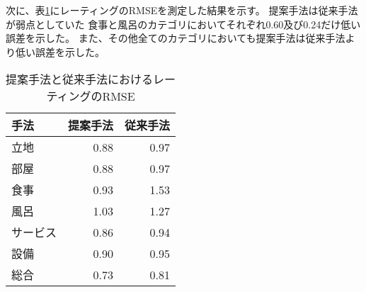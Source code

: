 次に、表\ref{tab:RMSEs}にレーティングのRMSEを測定した結果を示す。
提案手法は従来手法\cite{fujitani15}が弱点としていた
食事と風呂のカテゴリにおいてそれぞれ0.60及び0.24だけ低い誤差を示した。
また、その他全てのカテゴリにおいても提案手法は従来手法より低い誤差を示した。

\begin{table}[b!]
  \caption{提案手法と従来手法\cite{fujitani15}におけるレーティングのRMSE}
  \centering
  \begin{tabular}{l | r r} \label{tab:RMSEs}
    手法 & 提案手法 & 従来手法\cite{fujitani15} \\
    \hline
    立地      & 0.88 & 0.97 \\
    部屋      & 0.88 & 0.97 \\
    食事      & 0.93 & 1.53 \\
    風呂      & 1.03 & 1.27 \\
    サービス  & 0.86 & 0.94 \\
    設備      & 0.90 & 0.95 \\
    総合      & 0.73 & 0.81 \\
  \end{tabular}
\end{table}
